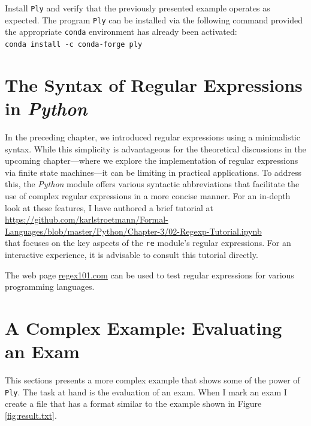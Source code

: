 \homeworkEng
Install \texttt{Ply} and verify that the previously presented example operates as expected.
The program \texttt{Ply} can be installed via the following command provided the appropriate \texttt{conda}
environment has already been activated:
\\[0.2cm]
\hspace*{1.3cm}
\texttt{conda install -c conda-forge ply}
\pagebreak

\section{The Syntax of Regular Expressions in \textsl{Python}}
In the preceding chapter, we introduced regular expressions using a minimalistic syntax. While this simplicity
is advantageous for the theoretical discussions in the upcoming chapter---where we explore the implementation of
regular expressions via finite state machines---it can be limiting in practical applications. To address this,
the \textsl{Python} module  offers various syntactic abbreviations that facilitate the
use of complex regular expressions in a more concise manner. For an in-depth look at these features, I
have authored a brief tutorial at 
\\[0.2cm]
\hspace*{-1.3cm}
\href{https://github.com/karlstroetmann/Formal-Languages/blob/master/Python/Chapter-03/02-Regexp-Tutorial.ipynb}{https://github.com/karlstroetmann/Formal-Languages/blob/master/Python/Chapter-3/02-Regexp-Tutorial.ipynb}
\\[0.2cm]
that focuses on the key aspects of the \texttt{re} module's regular expressions. For an interactive experience,
it is advisable to consult this tutorial directly. 

The web page \href{https://regex101.com}{regex101.com} can be used to test regular expressions for
various programming languages. 

\section{A Complex Example: Evaluating an Exam}
This sections presents a more complex example that shows some of the power of \texttt{Ply}.  The
task at hand is the evaluation of an exam.  When I mark an exam I create a file that has a format
similar to the example shown in Figure \ref{fig:result.txt}. 

